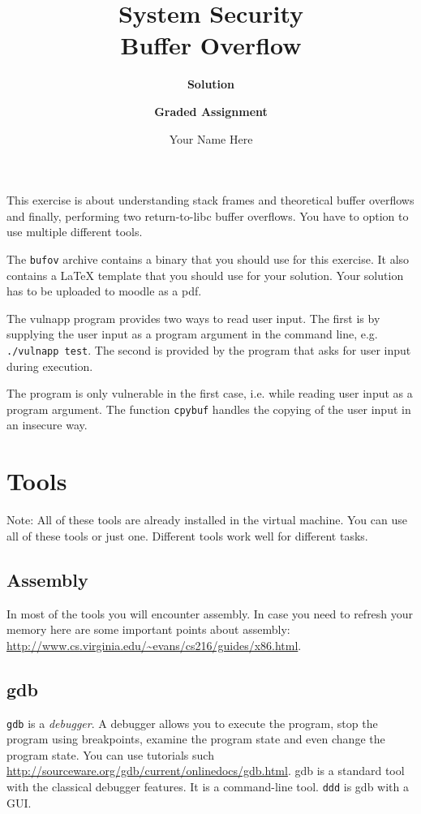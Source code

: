 \documentclass[a4paper,11pt]{article}
\title{System Security\\
Buffer Overflow}
\author{\bf Solution}
\author{\bf Graded Assignment}
\author{Your Name Here}
\begin{document}
\maketitle

This exercise is about understanding stack frames and theoretical buffer overflows and finally, performing two return-to-libc buffer overflows. You have to option to use multiple different tools.
 
The \texttt{bufov} archive contains a binary that you should use for this exercise. It also contains a \LaTeX{} template that you should use for your solution. Your solution has to be uploaded to moodle as a pdf.

The {\sc vulnapp} program provides two ways to read user input. The first is by supplying the user input as a program argument in the command line, e.g. \verb|./vulnapp test|. The second is provided by the program that asks for user input during execution.

The program is only vulnerable in the first case, i.e. while reading user input as a program argument. The function {\tt cpybuf} handles the copying of the user input in an insecure way.

\section*{Tools}
Note: All of these tools are already installed in the virtual machine. You can use all of these tools or just one. Different tools work well for different tasks.

\subsection*{Assembly}
In most of the tools you will encounter assembly. In case you need to refresh your memory here are some important points about assembly:
\url{http://www.cs.virginia.edu/~evans/cs216/guides/x86.html}.

\subsection*{gdb}

\texttt{gdb} is a \emph{debugger}. A debugger allows you to execute the program, stop the program using breakpoints, examine the program state and even change the program state. You can use tutorials such \url{http://sourceware.org/gdb/current/onlinedocs/gdb.html}. gdb is a standard tool with the classical debugger features. It is a command-line tool. \texttt{ddd} is gdb with a GUI.
\end{document}
